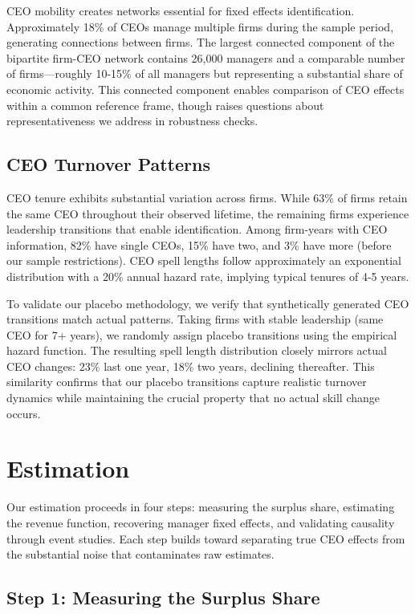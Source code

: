 \documentclass[11pt,a4paper]{article}
\begin{document}
CEO mobility creates networks essential for fixed effects identification. Approximately 18\% of CEOs manage multiple firms during the sample period, generating connections between firms. The largest connected component of the bipartite firm-CEO network contains 26,000 managers and a comparable number of firms—roughly 10-15\% of all managers but representing a substantial share of economic activity. This connected component enables comparison of CEO effects within a common reference frame, though raises questions about representativeness we address in robustness checks.

\subsection{CEO Turnover Patterns}

CEO tenure exhibits substantial variation across firms. While 63\% of firms retain the same CEO throughout their observed lifetime, the remaining firms experience leadership transitions that enable identification. Among firm-years with CEO information, 82\% have single CEOs, 15\% have two, and 3\% have more (before our sample restrictions). CEO spell lengths follow approximately an exponential distribution with a 20\% annual hazard rate, implying typical tenures of 4-5 years.

To validate our placebo methodology, we verify that synthetically generated CEO transitions match actual patterns. Taking firms with stable leadership (same CEO for 7+ years), we randomly assign placebo transitions using the empirical hazard function. The resulting spell length distribution closely mirrors actual CEO changes: 23\% last one year, 18\% two years, declining thereafter. This similarity confirms that our placebo transitions capture realistic turnover dynamics while maintaining the crucial property that no actual skill change occurs.

\section{Estimation}

Our estimation proceeds in four steps: measuring the surplus share, estimating the revenue function, recovering manager fixed effects, and validating causality through event studies. Each step builds toward separating true CEO effects from the substantial noise that contaminates raw estimates.

\subsection{Step 1: Measuring the Surplus Share}
\end{document}
